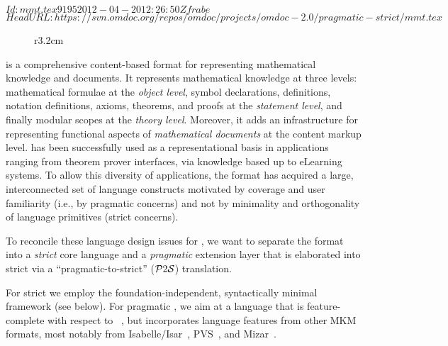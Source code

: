 \svnInfo $Id: mmt.tex 9195 2012-04-20 12:26:50Z frabe $
\svnKeyword $HeadURL: https://svn.omdoc.org/repos/omdoc/projects/omdoc-2.0/pragmatic-strict/mmt.tex $

\begin{wrapfigure}r{3.2cm}\vspace*{-2em}
\vspace*{-2em}
\end{wrapfigure}
\omdoc is a comprehensive content-based format for representing mathematical knowledge and
documents. It represents mathematical knowledge at three levels: mathematical formulae at the
\emph{object level}, symbol declarations, definitions, notation definitions, axioms, theorems, and
proofs at the \emph{statement level}, and finally modular scopes at the \emph{theory level}. Moreover, it adds
an infrastructure for representing functional aspects of \emph{mathematical documents} at the
content markup level.  has been successfully used as a representational basis in applications
ranging from theorem prover interfaces, via knowledge based up to eLearning systems. To allow
this diversity of applications, the format has acquired a large, interconnected set of language
constructs motivated by coverage and user familiarity (i.e., by pragmatic concerns) and not by
minimality and orthogonality of language primitives (strict concerns).

To reconcile these language design issues for , we want to separate the format into a \emph{strict} core language
and a \emph{pragmatic} extension layer that is elaborated into strict \omdoc via a ``pragmatic-to-strict'' ($\mathcal{P}2\mathcal{S}$) translation.

For strict \omdoc we employ the foundation-independent, syntactically minimal {\mmt} framework
(see below). For pragmatic \omdoc, we aim at a language that is feature-complete with
respect to ~\cite{Kohlhase:OMDoc1.2}, but incorporates language features from
other MKM formats, most notably from Isabelle/Isar~\cite{isar},
PVS~\cite{pvs}, and Mizar~\cite{mizar}.

